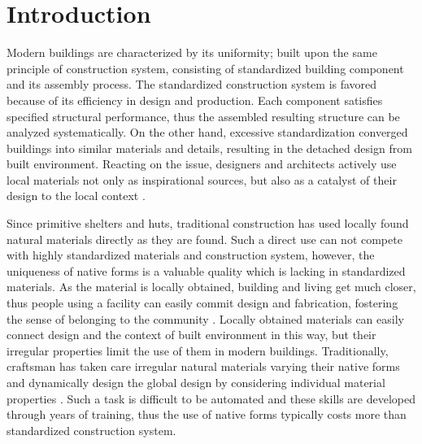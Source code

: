 \section{Introduction}
Modern buildings are characterized by its uniformity; built upon the same principle of construction system, consisting of standardized building component and its assembly process.
The standardized construction system is favored because of its efficiency in design and production.
Each component satisfies specified structural performance, thus the assembled resulting structure can be analyzed systematically.
On the other hand, excessive standardization converged buildings into similar materials and details, resulting in the detached design from built environment.
Reacting on the issue, designers and architects actively use local materials not only as inspirational sources, but also as a catalyst of their design to the local context \cite{oliver1997encyclopedia}.

Since primitive shelters and huts, traditional construction has used locally found natural materials directly as they are found.
Such a direct use can not compete with highly standardized materials and construction system, however, the uniqueness of native forms is a valuable quality which is lacking in standardized materials.
As the material is locally obtained, building and living get much closer, thus people using a facility can easily commit design and fabrication, fostering the sense of belonging to the community \cite{}. 
Locally obtained materials can easily connect design and the context of built environment in this way, but their irregular properties limit the use of them in modern buildings.
Traditionally, craftsman has taken care irregular natural materials varying their native forms and dynamically design the global design by considering individual material properties \cite{pye1968nature}.
Such a task is difficult to be automated and these skills are developed through years of training, thus the use of native forms typically costs more than standardized construction system. \\

